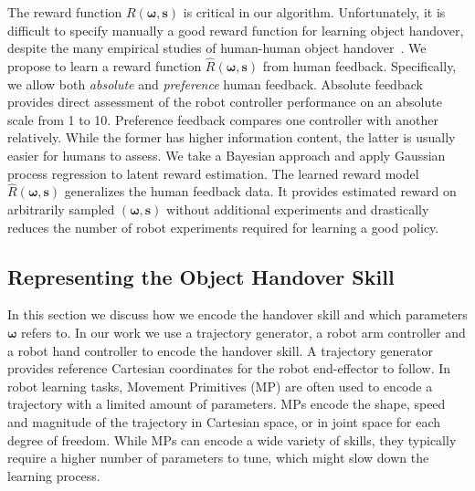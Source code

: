 The reward function $R( {\boldsymbol{\omega}} ,   {\boldsymbol{s}} )$ is critical in our algorithm. Unfortunately, it is difficult to specify manually a good reward function for learning object handover, despite the many empirical studies of human-human object
handover~\citep{CakSri11, ChaPar13,HubKup13, Strabala_JHRI_2013}.  We propose to learn a reward function $\hat{R}( {\boldsymbol{\omega}} ,   {\boldsymbol{s}} )$ from human feedback. Specifically, we allow both \emph{absolute} and \emph{preference}
human feedback. Absolute feedback provides direct assessment of the robot controller performance on an absolute scale from 1 to 10. Preference feedback compares one controller with another relatively. While the former has higher information content, the latter is usually easier for humans to assess. We take a Bayesian approach and apply Gaussian process regression to latent reward estimation.  The learned reward model $\hat{R}( {\boldsymbol{\omega}} ,   {\boldsymbol{s}} )$ generalizes the human feedback data. It provides estimated reward on arbitrarily sampled $( {\boldsymbol{\omega}} ,  {\boldsymbol{s}} )$ without additional experiments and drastically reduces the number of robot experiments required for learning a good  policy.

\subsection{Representing the Object Handover Skill}

	\label{sec:skill}
In this section we discuss how we encode the handover skill and which parameters $ {\boldsymbol{\omega}} $ refers to. In our work we use a trajectory generator, a robot arm controller and a robot hand controller to encode the handover skill. A trajectory generator provides reference Cartesian coordinates for the robot end-effector to follow. In robot learning tasks, Movement Primitives (MP) are often used to encode a trajectory with a limited amount of parameters. MPs encode the shape, speed and magnitude of the trajectory in Cartesian space, or in joint space for each degree of freedom. While MPs can encode a wide variety of skills, they typically require a higher number of parameters to tune, which might slow down the learning process.

